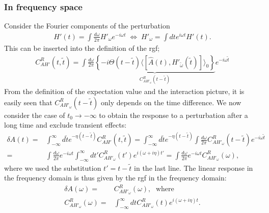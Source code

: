 \documentclass[english]{scrartcl}
\begin{document}
\subsubsection{In frequency space}
Consider the Fourier components of the perturbation 
\begin{align*}
H'(t) = \int \frac{d \omega}{2 \pi}  H'_\omega e^{- i \omega t} \; \Leftrightarrow \; H'_\omega = \int d t  e^{i \omega t} H'(t).
\end{align*}
This can be inserted into the definition of the \gls{rgf};
\begin{align*}
C_{AH'}^R (t, \tilde t) = \int \frac{d \omega}{2 \pi}  \underbrace{\left \{ -i \Theta (t - \tilde t) \langle \left[\hat A (t), \hat H'_{\tilde \omega} (\tilde t)\right ] \rangle_0 \right \}}_{C_{AH'_\omega}^R (t - \tilde t) }e^{- i \omega \tilde t}
\end{align*}
From the definition of the expectation value and the interaction picture, it is easily seen that $C_{AH'_\omega}^R (t - \tilde t)$ only depends on the time difference. We now consider the case of $t_0 \to - \infty$ to obtain the response to a perturbation after a long time and exclude transient effects:
\begin{align*}
\delta A(t)=& \int_{-\infty}^\infty d \tilde t e^{-\eta (t - \tilde t)} C_{AH'}^R (t, \tilde t) = \int_{-\infty}^\infty  d \tilde t e^{-\eta (t - \tilde t)}  \int \frac{d \omega}{2 \pi}  C_{AH'_\omega}^R (t - \tilde t) e^{- i \omega \tilde t} \\
=&    \int \frac{d \omega}{2 \pi} e^{-i \omega t}   \int_{-\infty}^\infty  d t'  C_{AH'_\omega}^R (t') e^{i (\omega + i \eta) t'} =  \int \frac{d \omega}{2 \pi} e^{-i \omega t}  C_{AH'_\omega}^R (\omega) ,
\end{align*}
where we used the substitution $t' = t - \tilde t$ in the last line. The linear response in the frequency domain is thus given by the \gls{rgf} in the frequency domain:
\begin{align}
\delta A(\omega)=& C_{AH'_\omega}^R (\omega), \; \text{ where } \nonumber \\
C_{AH'_\omega}^R (\omega) =& \int_{-\infty}^\infty d t C_{AH'_\omega}^R (t) e^{i (\omega + i \eta)t}. \label{Eqn:Kubo_omega}
\end{align}
\end{document}
